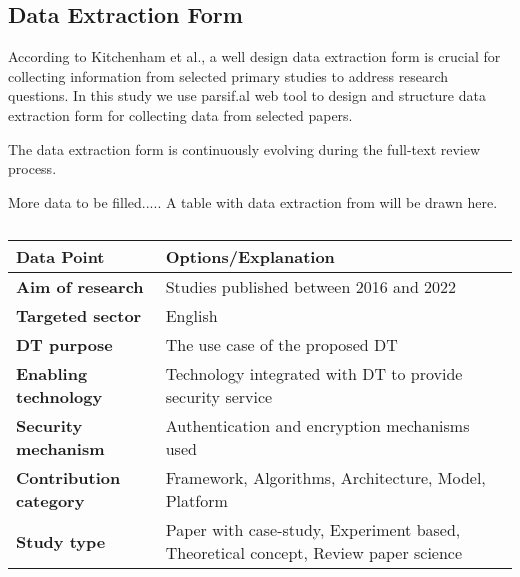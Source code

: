 
\subsection{Data Extraction Form}
According to Kitchenham et al.\cite{kitchenham_guidelines_2007}, a well design data extraction form is crucial for collecting information from selected primary studies to address research questions. In this study we use parsif.al web tool to design and structure data extraction form for collecting data from selected papers.  

The data extraction form is continuously evolving during the full-text review process. 

More data to be filled..... A table with data extraction from will be drawn here. 

\begin{table}[h]
\small
\centering
\caption{\label{tbl:extraction}}
\begin{NiceTabular}{p{4cm}p{8cm}}
\toprule
    \textbf{Data Point} & \textbf{Options/Explanation} \\
    \midrule
    \textbf{Aim of research} & Studies published between 2016 and 2022 \\ 
    \textbf{Targeted sector} & English\\
    \textbf{DT purpose} & The use case of the proposed DT \\ 
    \textbf{Enabling technology} & Technology integrated with DT to provide security service \\ 
    \textbf{Security mechanism} &  Authentication and encryption mechanisms used   \\ 
    \textbf{Contribution category} & Framework, Algorithms, Architecture, Model, Platform \\
    \textbf{Study type} & Paper with case-study, Experiment based, Theoretical concept, Review paper science  \\
\bottomrule
\end{NiceTabular}
\end{table}